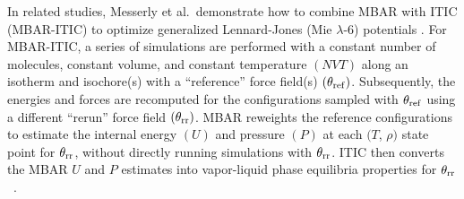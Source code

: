 \documentclass[journal=jced,manuscript=article]{achemso}
\begin{document}

In related studies, Messerly et al.~demonstrate how to combine MBAR with ITIC (MBAR-ITIC) to optimize generalized Lennard-Jones (Mie $\lambda$-6) potentials \cite{Postdoc_1,Postdoc_2}. For MBAR-ITIC, a series of simulations are performed with a constant number of molecules, constant volume, and constant temperature $(NVT)$ along an isotherm and isochore(s) with a ``reference'' force field(s) $(\theta_{\rm ref})$. Subsequently, the energies and forces are recomputed for the configurations sampled with $\theta_{\rm ref}$ using a different ``rerun'' force field $(\theta_{\rm rr})$. MBAR reweights the reference configurations to estimate the internal energy $(U)$ and pressure $(P)$ at each $(T$, $\rho)$ state point for $\theta_{\rm rr}$, without directly running simulations with $\theta_{\rm rr}$. ITIC then converts the MBAR $U$ and $P$ estimates into vapor-liquid phase equilibria properties for $\theta_{\rm rr}$~\cite{Mostafa_Diss,Mostafa2018}.

\end{document}
